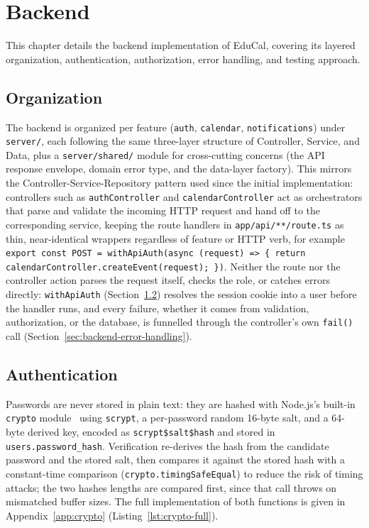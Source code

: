 %
%
\chapter{Backend} \label{cap:backend}

This chapter details the backend implementation of EduCal, covering its layered organization, authentication, authorization, error handling, and testing approach.

\section{Organization} \label{sec:backend-organization}

The backend is organized per feature (\texttt{auth}, \texttt{calendar}, \texttt{notifications}) under \texttt{server/}, each following the same three-layer structure of Controller, Service, and Data, plus a \texttt{server/shared/} module for cross-cutting concerns (the API response envelope, domain error type, and the data-layer factory). This mirrors the Controller-Service-Repository pattern used since the initial implementation: controllers such as \texttt{authController} and \texttt{calendarController} act as orchestrators that parse and validate the incoming HTTP request and hand off to the corresponding service, keeping the route handlers in \texttt{app/api/**/route.ts} as thin, near-identical wrappers regardless of feature or HTTP verb, for example \texttt{export const POST = withApiAuth(async (request) => \{ return calendarController.createEvent(request); \})}. Neither the route nor the controller action parses the request itself, checks the role, or catches errors directly: \texttt{withApiAuth} (Section~\ref{sec:backend-authentication}) resolves the session cookie into a user before the handler runs, and every failure, whether it comes from validation, authorization, or the database, is funnelled through the controller's own \texttt{fail()} call (Section~\ref{sec:backend-error-handling}).

\section{Authentication} \label{sec:backend-authentication}

Passwords are never stored in plain text: they are hashed with Node.js's built-in \texttt{crypto} module~\cite{nodejscrypto} using \texttt{scrypt}, a per-password random 16-byte salt, and a 64-byte derived key, encoded as \texttt{scrypt\$salt\$hash} and stored in \texttt{users.password\_hash}. Verification re-derives the hash from the candidate password and the stored salt, then compares it against the stored hash with a constant-time comparison (\texttt{crypto.timingSafeEqual}) to reduce the risk of timing attacks; the two hashes lengths are compared first, since that call throws on mismatched buffer sizes. The full implementation of both functions is given in Appendix~\ref{app:crypto} (Listing~\ref{lst:crypto-full}).

